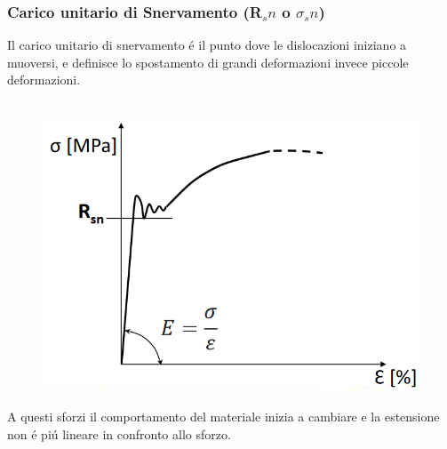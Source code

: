 \documentclass{article}
\begin{document}
{            \subsubsection{Carico unitario di Snervamento (R$_sn$ o $\sigma_sn$)}
                Il carico unitario di snervamento \'e il punto dove le dislocazioni iniziano a muoversi, e definisce lo spostamento di grandi deformazioni invece piccole deformazioni.\\ \\
                \begin{figure}[!h]
                    \centering
                    \includegraphics[width=.85\linewidth]{Carico Unitario di Snervamento.png}
                \end{figure}
                A questi sforzi il comportamento del materiale inizia a cambiare e la estensione non \'e pi\'u lineare in confronto allo sforzo.
}
\end{document}
